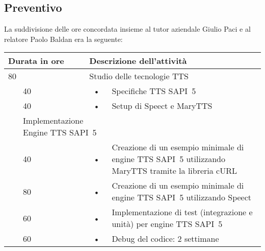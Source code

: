 \subsection{Preventivo}

La suddivisione delle ore concordata insieme al tutor aziendale Giulio Paci e al relatore Paolo Baldan era la seguente:

\begin{center}
	
	\begin{tabular} {|l|l|c p{10cm}|}
		\hline
		\multicolumn{2}{|l|}{\textbf{Durata in ore}}		&	\multicolumn{2}{l|}{\textbf{Descrizione dell'attività}}\\
		\hline
		\multicolumn{2}{|l|}{80}	&	\multicolumn{2}{l|}{Studio delle tecnologie TTS}\\
		\hline
		\multirow{3}{1cm}{ }    &            40            &            \hspace{5mm}•\hspace{2mm}            &  Specifiche TTS SAPI~5\\
		\cline{2-2}
		&            40            &            \hspace{5mm}•\hspace{2mm}            &            Setup di Speect e MaryTTS\\
		\hline
		
		\multicolumn{2}{|l|}{240}	&	\multicolumn{2}{l|}{Implementazione Engine TTS SAPI~5}\\
		\hline
		
		\multirow{3}{1cm}{ }    &            40            &            \hspace{5mm}•\hspace{2mm}            & Creazione di un esempio minimale di engine TTS SAPI~5 utilizzando MaryTTS tramite la libreria cURL \\
		\cline{2-2}
		&            80            &            \hspace{5mm}•\hspace{2mm}            &            Creazione di un esempio minimale di engine TTS SAPI~5 utilizzando Speect \\
		\cline{2-2}
		&            60            &            \hspace{5mm}•\hspace{2mm}            &            Implementazione di test (integrazione e unità) per engine TTS SAPI~5 \\
		\cline{2-2}
		&            60            &            \hspace{5mm}•\hspace{2mm}            &            Debug del codice: 2 settimane \\
		\hline
	\end{tabular}
	
\end{center}

